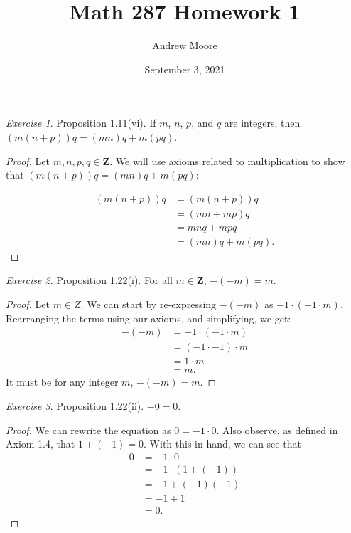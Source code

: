 \documentclass[12pt,oneside]{amsart}
\title{Math 287 Homework 1}
\author{Andrew Moore}
\date{September 3, 2021} %
\theoremstyle{remark}
\newtheorem{exer}{Exercise}
\begin{document}
\maketitle

\newpage
\begin{exer}
Proposition 1.11(vi). If $m$, $n$, $p$, and $q$ are integers, then \newline
$(m(n+p))q = (mn)q + m(pq)$.
\end{exer}

\begin{proof}
Let $m, n, p, q \in \mathbf{Z}.$ We will use axioms related to multiplication to show that $(m(n + p))q = (mn)q + m(pq):$

\begin{align*}
(m(n + p))q &= (m(n + p))q \\
            &= (mn + mp)q \tag{Axiom 1.1.3} \\
            &= mnq + mpq \tag{Axiom 1.1.3} \\
            &= (mn)q + m(pq). \tag{Axiom 1.1.5}
\end{align*}
\end{proof}

\newpage
\begin{exer}
Proposition 1.22(i). For all $m \in \mathbf{Z}$, $-(-m) = m$.
\end{exer}

\begin{proof}
Let $m \in Z$. We can start by re-expressing $-(-m)$ as $-1 \cdot (-1 \cdot m)$. Rearranging the terms using our axioms, and simplifying, we get:
\begin{align*}
-(-m) &= -1 \cdot (-1 \cdot m) \\
      &= (-1 \cdot -1) \cdot m \tag{Axiom 1.1.4} \\
      &= 1 \cdot m \tag{Corollary 1.21} \\
      &= m. \tag{Axiom 1.3}
\end{align*}
It must be for any integer $m$, $-(-m) = m$.
\end{proof}

\newpage
\begin{exer}
Proposition 1.22(ii). $-0 = 0$.
\end{exer}

\begin{proof}
We can rewrite the equation as $0 = -1 \cdot 0$. Also observe, as defined in Axiom 1.4, that $1 + (-1) = 0$. With this in hand, we can see that
\begin{align*}
0 &= -1 \cdot 0 \\
  &= -1 \cdot (1 + (-1)) \tag{Replacement} \\
  &= -1 + (-1)(-1) \tag{Axiom 1.1.3} \\
  &= -1 + 1 \tag{Simplifying, using Corollary 1.21} \\
  &= 0.
\end{align*}
\end{proof}
\end{document}
